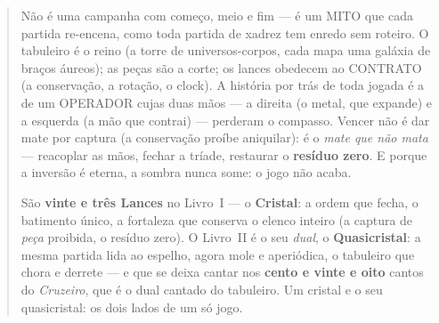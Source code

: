 \documentclass[livro.tex]{subfiles}
\begin{document}



\renewcommand{\chaptername}{Capítulo}


\begin{abstract}
\noindent Não é uma campanha com começo, meio e fim --- é um MITO que cada partida re-encena, como toda partida de
xadrez tem enredo sem roteiro. O tabuleiro é o reino (a torre de universos-corpos, cada mapa uma galáxia de braços
áureos); as peças são a corte; os lances obedecem ao CONTRATO (a conservação, a rotação, o clock). A
história por trás de toda jogada é a de um OPERADOR cujas duas mãos --- a direita (o metal, que expande) e a
esquerda (a mão que contrai) --- perderam o compasso. Vencer não é dar mate por captura (a
conservação proíbe aniquilar): é o \emph{mate que não mata} --- reacoplar as mãos, fechar a tríade, restaurar o
\textbf{resíduo zero}. E porque a inversão é eterna, a sombra nunca some: o jogo não acaba.

\medskip
\noindent São \textbf{vinte e três Lances} no Livro~I --- o \textbf{Cristal}: a ordem que fecha, o batimento
único, a fortaleza que conserva o elenco inteiro (a captura de \emph{peça} proibida, o resíduo zero). O Livro~II é o
seu \emph{dual}, o \textbf{Quasicristal}: a mesma partida lida ao espelho, agora mole e aperiódica, o tabuleiro que
chora e derrete --- e que se deixa cantar nos \textbf{cento e vinte e oito} cantos do \emph{Cruzeiro}, que é o dual cantado do tabuleiro. Um cristal e o seu quasicristal: os dois lados de um
só jogo.
\end{abstract}

\tableofcontents
\end{document}
